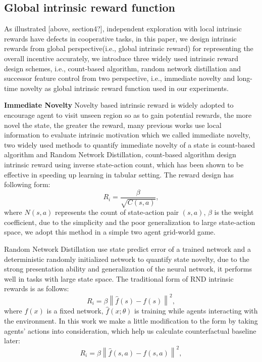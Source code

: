 \documentclass{article} %
\begin{document}
\subsection{Global intrinsic reward function}
As illustrated [above, section4?], independent exploration with local intrinsic rewards have defects in cooperative tasks, in this paper, we design intrinsic rewards from global perspective(i.e., global intrinsic reward) for representing the overall incentive accurately, we introduce three widely used intrinsic reward design schemes, i.e., count-based algorithm, random network distillation and successor feature control from two perspective, i.e., immediate novelty and long-time novelty as global intrinsic reward function used in our experiments.


\textbf{Immediate Novelty} 
Novelty based intrinsic reward is widely adopted to encourage agent to visit unseen region so as to gain potential rewards, the more novel the state, the greater the reward, many previous works use local information to evaluate intrinsic motivation which we called immediate novelty, two widely used methods to quantify immediate novelty of a state is count-based algorithm and Random Network Distillation, count-based algorithm design intrinsic reward using inverse state-action count, which has been shown to be effective in speeding up learning in tabular setting. The reward design has following form: 
\begin{equation}
\label{equation:1}
    R_{i}=\frac{\beta}{\sqrt{C(s, a)}}, 
\end{equation}
where $N(s, a)$ represents the count of state-action pair $(s, a)$, $\beta$ is the weight coefficient, due to the simplicity and the poor generalization to large state-action space, we adopt this method in a simple two agent grid-world game. 

Random Network Distillation use state predict error of a trained network and a deterministic randomly initialized network to quantify state novelty, due to the strong presentation ability and generalization of the neural network, it performs well in tasks with large state space. The traditional form of RND intrinsic rewards is as follows: 
\begin{equation}
\label{equation:2}
    R_{i}=\beta\left\|\hat{f}(s)-f(s)\right\|^{2},
\end{equation}
where $f(x)$ is a fixed network, $\hat{f}(x ; \theta)$ is training while agents interacting with the environment. In this work we make a little modification to the form by taking agents' actions into consideration, which help us calculate counterfactual baseline later:
\begin{equation}
\label{equation:3}
    R_{i}=\beta\left\|\hat{f}(s,a)-f(s,a)\right\|^{2},
\end{equation}
\end{document}

